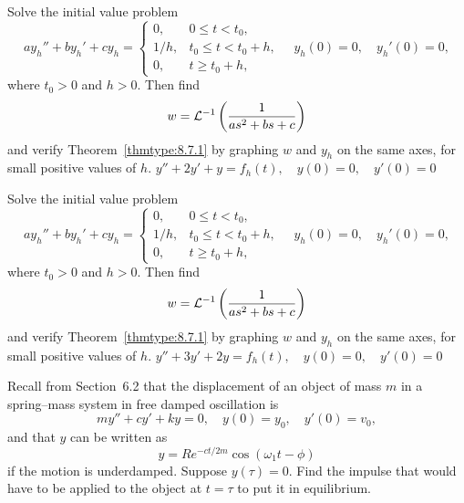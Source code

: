 \documentclass{ximera}
\begin{document}
\begin{problem}\label{exer:8.7.27} Solve the initial value problem
$$
ay_h''+by_h'+cy_h=
\left\{\begin{array}{cl} 0,&0\le t<t_0,\\
1/h,&t_0\le t< t_0+h,\\
0,&t\ge t_0+h,\end{array}\right.
\quad y_h(0)=0,\quad y_h'(0)=0,
$$
where $t_0>0$ and $h>0$. Then find
$$
w={\cal L}^{-1}\left(\frac{1}{as^2+bs+c}\right)
$$
and verify Theorem~\ref{thmtype:8.7.1} by graphing $w$ and $y_h$
on the same axes, for small positive values of $h$.
$y''+2y'+y=f_h(t), \quad  y(0)=0,\quad y'(0)=0$
\end{problem}

\begin{problem}\label{exer:8.7.28} Solve the initial value problem
$$
ay_h''+by_h'+cy_h=
\left\{\begin{array}{cl} 0,&0\le t<t_0,\\
1/h,&t_0\le t< t_0+h,\\
0,&t\ge t_0+h,\end{array}\right.
\quad y_h(0)=0,\quad y_h'(0)=0,
$$
where $t_0>0$ and $h>0$. Then find
$$
w={\cal L}^{-1}\left(\frac{1}{as^2+bs+c}\right)
$$
and verify Theorem~\ref{thmtype:8.7.1} by graphing $w$ and $y_h$
on the same axes, for small positive values of $h$.
$y''+3y'+2y=f_h(t), \quad  y(0)=0,\quad y'(0)=0$
\end{problem}

\begin{problem}\label{exer:8.7.29}

Recall from Section~6.2 that the displacement of
an
object of mass $m$ in a spring--mass system in free damped oscillation is
$$
my''+cy'+ky=0, \quad  y(0)=y_0,\quad y'(0)=v_0,
$$
and that $y$ can be written as
$$
y=Re^{-ct/2m}\cos(\omega_1t-\phi)
$$
if the motion is underdamped. Suppose $y(\tau)=0$.
Find the impulse that would have to be applied to the object at $t=\tau$
 to put it in equilibrium.
\end{problem}
\end{document}
